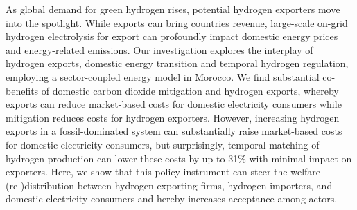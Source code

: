 
As global demand for green hydrogen rises, potential hydrogen exporters move into the spotlight.
While exports can bring countries revenue, large-scale on-grid hydrogen electrolysis for export can profoundly impact domestic energy prices and energy-related emissions.
Our investigation explores the interplay of hydrogen exports, domestic energy transition and temporal hydrogen regulation, employing a sector-coupled energy model in Morocco. 
We find substantial co-benefits of domestic carbon dioxide mitigation and hydrogen exports, whereby exports can reduce market-based costs for domestic electricity consumers while mitigation reduces costs for hydrogen exporters.
However, increasing hydrogen exports in a fossil-dominated system can substantially raise market-based costs for domestic electricity consumers, but surprisingly, temporal matching of hydrogen production can lower these costs by up to 31\% with minimal impact on exporters.
Here, we show that this policy instrument can steer the welfare (re-)distribution between hydrogen exporting firms, hydrogen importers, and domestic electricity consumers and hereby increases acceptance among actors.

